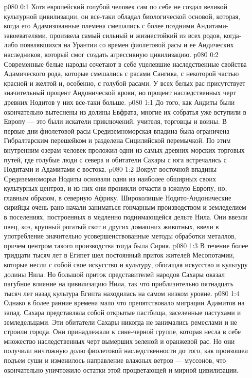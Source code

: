 \vs p080 0:1 Хотя европейский голубой человек сам по себе не создал великой культурной цивилизации, он все\hyp{}таки обладал биологической основой, которая, когда его Адамизованные племена смешались с более поздними Андитами\hyp{}завоевателями, произвела самый сильный и жизнестойкий из всех родов, когда\hyp{}либо появлявшихся на Урантии со времен фиолетовой расы и ее Андических наследников, который смог создать агрессивную цивилизацию.
\vs p080 0:2 Современные белые народы сочетают в себе уцелевшие наследственные свойства Адамического рода, которые смешались с расами Сангика, с некоторой частью красной и желтой и, особенно, с голубой расами. У всех белых рас присутствует значительный процент Андонической крови, но процент наследственных черт древних Нодитов у них все\hyp{}таки больше.
\vs p080 1:1 До того, как Андиты были окончательно вытеснены из долины Евфрата, многие их собратья уже вступили в Европу --- это были искатели приключений, учителя, торговцы и воины. В первые дни фиолетовой расы Средиземноморская впадина была ограничена Гибралтарским перешейком и разделена Сицилийской перемычкой. По этим внутренним озерам человек проложил одни из самых древних морских торговых путей, где голубые люди с севера и обитатели Сахары с юга встречались с Нодитами и Адамитами с востока.
\vs p080 1:2 Вокруг восточной впадины Средиземноморья Нодиты основали одни из наиболее обширных своих культурных центров, и из них они проникли отчасти в южную Европу, но, главным образом, в северную Африку. Широколицые Нодито\hyp{}Андонические сирийцы очень рано начали заниматься гончарным производством и земледелием в поселениях, построенных в медленно поднимающейся дельте Нила. Они ввезли овец, коз, крупный рогатый скот и других домашних животных, ввели в употребление значительно усовершенствованные методы обработки металлов, причем центром такого производства тогда была Сирия.
\vs p080 1:3 В течение более тридцати тысяч лет в Египет шел постоянный приток жителей Месопотамии, которые несли с собой свое искусство и культуру, обогащая искусство и культуру долины Нила. Но большой приток представителей народов Сахары оказал пагубное влияние на цивилизацию Нила, так что приблизительно пятнадцать тысяч лет назад культура Египта находилась на самом низком уровне.
\vs p080 1:4 Однако в более ранние времена мало что препятствовало миграции Адамитов на запад. Сахара представляла собой открытые пастбища, заселенные пастухами и земледельцами. Эти обитатели Сахары никогда не занимались ремеслами и не строили города. Они принадлежали к сине\hyp{}черной группе, которая несла в себе множество наследственных черт вымерших зеленой и оранжевой рас. Но они получили ничтожную долю фиолетовой наследственности до того, как произошел подъем суши и изменилось направление влажных ветров --- муссонов, что окончательно уничтожило остатки этой процветающей и мирной цивилизации.
